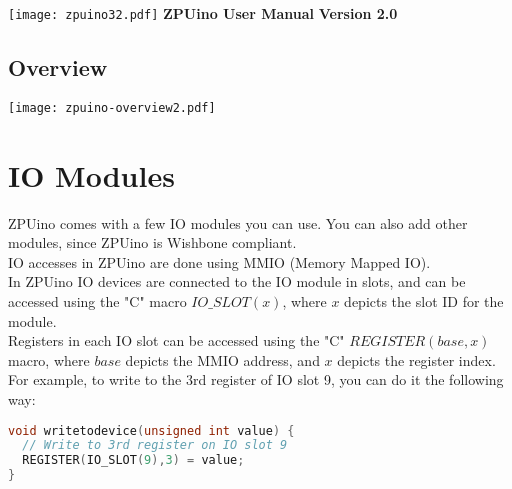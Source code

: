 \documentclass[12pt,a4paper,openany,smallheadings,headinclude,headsepline,final]{scrreprt}
\begin{document}
\pagestyle{headings}

\parindent 0cm
\parskip 0.2cm

\begin{titlepage}
\begin{center}
\texttt{[image: zpuino32.pdf]}
\huge{\bfseries{ZPUino User Manual}}
\large{\bfseries{Version 2.0}}
\end{center}

\end{titlepage}

\tableofcontents
\clearpage




\section{Overview}
\texttt{[image: zpuino-overview2.pdf]}



\chapter{IO Modules}
ZPUino comes with a few IO modules you can use. You can also add other modules, since ZPUino is Wishbone compliant.\\
IO accesses in ZPUino are done using MMIO (Memory Mapped IO).\\
In ZPUino IO devices are connected to the IO module in slots, and can be accessed using the "C" macro $IO\_SLOT(x)$, where $x$
depicts the slot ID for the module.\\


Registers in each IO slot can be accessed using the "C" $REGISTER(base,x)$ macro, 
where $base$ depicts the MMIO address, and $x$ depicts the register index.\\

For example, to write to the 3rd register of IO slot 9, you can do it the following way:
\begin{lstlisting}[language=C++]
void writetodevice(unsigned int value) {
  // Write to 3rd register on IO slot 9 
  REGISTER(IO_SLOT(9),3) = value;
}
\end{lstlisting}
\end{document}
